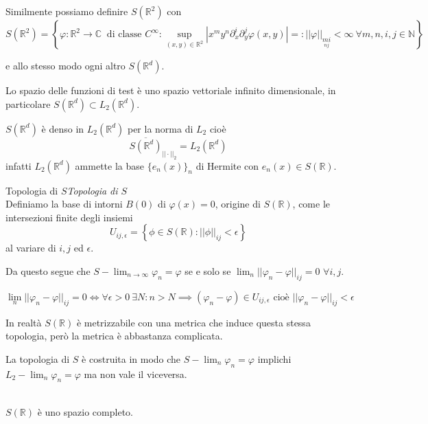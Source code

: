 \documentclass[11pt,a4paper,twoside]{book}
\newenvironment{teorema}[1][\empty]{\begin{Teorema}{
\ifx\empty#1\relax\else\mdseries\itshape#1\\\fi
}{}}{\end{Teorema}}
\newenvironment{definizione}[1][\empty]{\begin{Definizione}{
\ifx\empty#1\relax\else\mdseries\itshape#1\\\fi
}{}}{\end{Definizione}}
\newenvironment{osservazione}[1][Osservazione]{ 
  \begin{center}\begin{tcolorbox}[
  title={#1:~},
  width=0.9\linewidth,
  flush right,
  enhanced jigsaw, 
  colback=white, 
  frame hidden, 
  sharpish corners, arc=3mm,
  borderline west = {1pt}{0pt}{gray},
  borderline south = {1pt}{0pt}{gray},
  coltitle=black, 
  fonttitle=\small\bfseries, 
  attach title to upper, 
  breakable,
  top=2.5pt, bottom=0.3pt]\small
  }{
 \normalsize \end{tcolorbox}\end{center}
}
\theoremstyle{esss}
\theoremstyle{dotless}
\numberwithin{equation}{section} %
\begin{document}
Similmente possiamo definire $S(\mathbb{R}^2)$ con
\[
S(\mathbb{R}^2)=\left\{ \varphi:\mathbb{R}^2\rightarrow\mathbb{C} \> \text{ di classe } C^\infty : \sup_{(x,y)\in\mathbb{R}^2}\left|x^my^n\partial_x^i\partial_y^j \varphi(x,y)\right|=:||\varphi||_{\underset{nj}{mi}}<\infty\>\forall m,n,i,j\in\mathbb{N}\right\}
\]

e allo stesso modo ogni altro $S(\mathbb{R}^d)$.

Lo spazio delle funzioni di test è uno spazio vettoriale infinito dimensionale, in particolare $S(\mathbb{R}^d)\subset L_2(\mathbb{R}^d)$. 


$S(\mathbb{R}^d)$ è denso in $L_2(\mathbb{R}^d)$ per la norma di $L_2$ cioè
\[
\left.\overline{S\left(\mathbb{R}^d\right)}\right._{||\cdot||_2}=L_2\left(\mathbb{R}^d\right)
\]
infatti $L_2(\mathbb{R}^d)$ ammette la base $\{e_n(x)\}_n$ di Hermite con $e_n(x)\in S(\mathbb{R})$.

\begin{definizione}[Topologia di $S$]
Definiamo la base di intorni $B(0)$ di $\varphi(x)=0$, origine di $S(\mathbb{R})$, come le intersezioni finite 
degli insiemi 
\[
U_{ij,\epsilon}=\left\{\phi\in S(\mathbb{R}) : ||\phi||_{ij}<\epsilon\right\}
\]
al variare di $i,j$ ed $\epsilon$.
\end{definizione}

Da questo segue che $S-\lim_{n\rightarrow\infty}\varphi_n=\varphi$ se e solo se $\lim_n ||\varphi_n-\varphi||_{ij}=0$ $\forall i,j$.

\begin{osservazione}[Nota]
\[
\lim_n ||\varphi_n-\varphi||_{ij}=0 \iff \forall\epsilon>0\> \exists N : n>N \implies(\varphi_n-\varphi)\in U_{ij,\epsilon} \text{ cioè }||\varphi_n-\varphi||_{ij}<\epsilon 
\]


In realtà $S(\mathbb{R})$ è metrizzabile con una metrica che induce questa stessa topologia, però la metrica è abbastanza complicata.
\end{osservazione}

La topologia di $S$ è costruita in modo che $S-\lim_n \varphi_n = \varphi$ implichi $L_2-\lim_n \varphi_n=\varphi$ ma non vale il viceversa.

\begin{teorema}$S(\mathbb{R})$ è uno spazio completo.\end{teorema}
\end{document}
